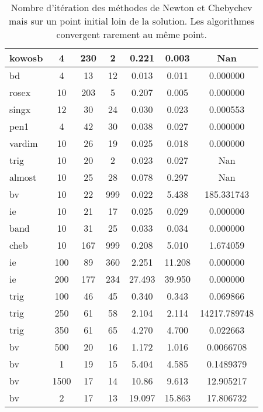 \begin{table}
\begin{center}
{\begin{tabular}{|l|c|c|c|c|c|c|}
   kowosb& 4 & 230 & 2 & 0.221 & 0.003 & Nan \\\hline
   bd& 4 & 13 & 12 & 0.013 & 0.011 & 0.000000 \\\hline
   rosex& 10 & 203 & 5 & 0.207 & 0.005 & 0.000000 \\\hline
   singx& 12 & 30 & 24 & 0.030 & 0.023 & 0.000553 \\\hline
   pen1& 4 & 42 & 30 & 0.038 & 0.027 & 0.000000 \\\hline
   vardim& 10 & 26 & 19 & 0.025 & 0.018 & 0.000000 \\\hline
   trig& 10 & 20 & 2 & 0.023 & 0.027 & Nan \\\hline
   almost& 10 & 25 & 28 & 0.078 & 0.297 & Nan \\\hline
   bv& 10 & 22 & 999 & 0.022 & 5.438 & 185.331743 \\\hline
   ie& 10 & 21 & 17 & 0.025 & 0.029 & 0.000000 \\\hline
   band& 10 & 31 & 25 & 0.033 & 0.034 & 0.000000 \\\hline
   cheb& 10 & 167 & 999 & 0.208 & 5.010 & 1.674059 \\\hline
   ie & 100 & 89 & 360 & 2.251 & 11.208 & 0.000000 \\\hline 
   ie& 200 & 177 & 234 & 27.493 & 39.950 & 0.000000 \\\hline
   trig& 100 & 46 & 45 & 0.340 & 0.343 & 0.069866 \\\hline 
   trig& 250 & 61 & 58 & 2.104 & 2.114 & 14217.789748 \\\hline  
   trig& 350 & 61 & 65 & 4.270 & 4.700 & 0.022663 \\\hline  
   bv& 500 & 20 & 16 & 1.172 & 1.016 & 0.0066708 \\\hline
   bv& 1 & 19 & 15 & 5.404 & 4.585 &  0.1489379 \\\hline
   bv& 1500 & 17 & 14 & 10.86 & 9.613 & 12.905217 \\\hline
   bv& 2 & 17 & 13 & 19.097 & 15.863 & 17.806732 \\\hline
\end{tabular}
}
	\end{center}
	\caption{Nombre d'it\'eration des m\'ethodes de Newton et Chebychev mais sur un point initial loin de la 
solution. Les algorithmes convergent rarement au même point.}
	\label{tab:111}
\end{table}
